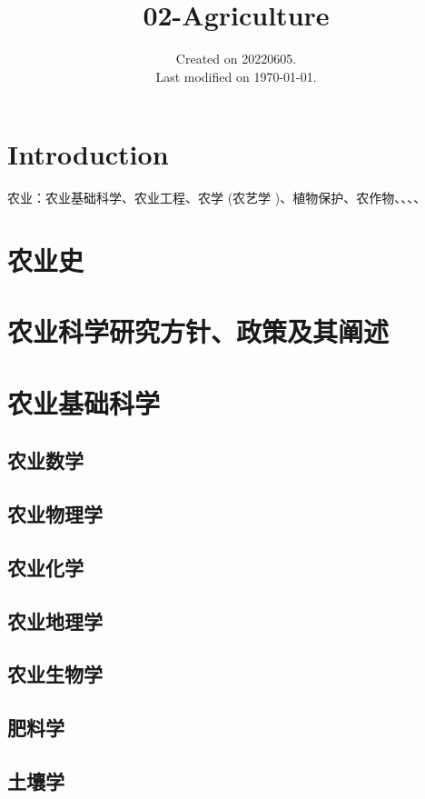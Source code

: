 \documentclass[UTF8]{../ApplicationUniverse}
\begin{document}
\title{02-Agriculture}
\date{Created on 20220605.\\   Last modified on \today.}
\maketitle
\tableofcontents


\chapter{Introduction}

农业：农业基础科学、农业工程、农学 (农艺学 )、植物保护、农作物、、、、

\chapter{农业史}


\chapter{农业科学研究方针、政策及其阐述}







\chapter{农业基础科学}
\section{农业数学}
\section{农业物理学}
\section{农业化学}
\section{农业地理学}
\section{农业生物学}
\section{肥料学}
\section{土壤学}
\end{document}
